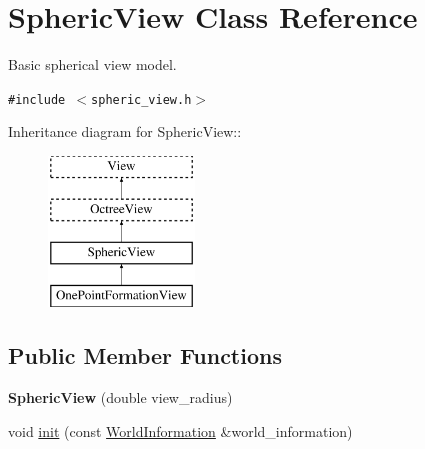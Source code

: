 \hypertarget{class_spheric_view}{
\section{SphericView Class Reference}
\label{class_spheric_view}
}
Basic spherical view model.  


{\tt \#include $<$spheric\_\-view.h$>$}

Inheritance diagram for SphericView::\begin{figure}[H]
\begin{center}
\leavevmode
\includegraphics[height=4cm]{class_spheric_view}
\end{center}
\end{figure}
\subsection*{Public Member Functions}
\begin{CompactItemize}
\item 
\hypertarget{class_spheric_view_bfe97f597005a4de0a36ef639990ab63}{
\textbf{SphericView} (double view\_\-radius)}
\label{class_spheric_view_bfe97f597005a4de0a36ef639990ab63}

\item 
void \hyperlink{class_spheric_view_dbd6a1d5e2f17594f82e831c38d35ec6}{init} (const \hyperlink{class_world_information}{WorldInformation} \&world\_\-information)
\end{CompactItemize}
